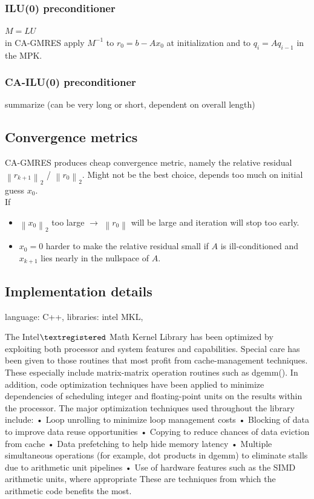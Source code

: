 \documentclass{scrartcl}
\newcommand{\norm}[1]{\left\lVert#1\right\rVert}
\begin{document}
\subsubsection{ILU(0) preconditioner}
$M = LU$ \\
in CA-GMRES apply $M^{-1}$ to $r_0 = b - Ax_0$ at initialization and to $ q_i = Aq_{i-1}$ in the MPK.
\subsubsection{CA-ILU(0) preconditioner} \label{sec:ca-ilu}
summarize \cite{Grigori} (can be very long or short, dependent on overall length)
\subsection{Convergence metrics}
CA-GMRES produces cheap convergence metric, namely the relative residual $\norm{r_{k+1}}_2$ / $\norm{r_0}_2$. Might not be the best choice, depends too much on initial guess $x_0$.\\

If 
\begin{itemize}
\item $\norm{x_0}_2$ too large $\rightarrow$ $\norm{r_0}$ will be large and iteration will stop too early.
\item $x_0 = 0$ harder to make the relative residual small if $A$ is ill-conditioned and $x_{k+1}$ lies nearly in the nullspace of $A$.
\end{itemize}
\subsection{Implementation details}
language: C++, libraries: intel MKL,

The Intel$\textregistered$ Math Kernel Library has been optimized by exploiting both processor and system features and
capabilities. Special care has been given to those routines that most profit from cache-management
techniques. These especially include matrix-matrix operation routines such as dgemm().
In addition, code optimization techniques have been applied to minimize dependencies of scheduling integer
and floating-point units on the results within the processor.
The major optimization techniques used throughout the library include:
• Loop unrolling to minimize loop management costs
• Blocking of data to improve data reuse opportunities
• Copying to reduce chances of data eviction from cache
• Data prefetching to help hide memory latency
• Multiple simultaneous operations (for example, dot products in dgemm) to eliminate stalls due to
arithmetic unit pipelines
• Use of hardware features such as the SIMD arithmetic units, where appropriate
These are techniques from which the arithmetic code benefits the most.
\end{document}
